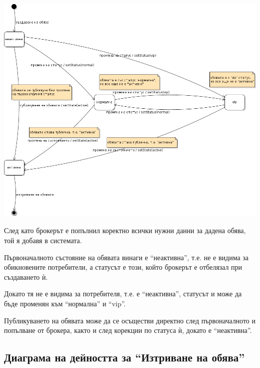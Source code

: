\documentclass[a4paper]{article}
\begin{document}
\begin{center}
\includegraphics[scale=0.5,keepaspectratio=true]{uml07}
\end{center}

След като брокерът е попълнил коректно всички нужни данни за дадена обява, той я добавя в системата. 

Първоначалното състояние на обявата винаги е ``неактивна'', т.е. не е видима за обикновените потребители, а статусът е този, който брокерът е отбелязал при създаването ѝ. 

Докато тя не е видима за потребителя, т.е. е ``неактивна'', статусът и може да бъде променян към ``нормална'' и ``vip''.

Публикуването на обявата може да се осъществи директно след първоначалното и попълване от брокера, както и след корекции по статуса ѝ, докато е ``неактивна''.

\clearpage
\subsection{Диаграма на дейността за ``Изтриване на обява''} %
\end{document}

